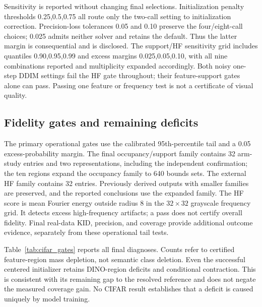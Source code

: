 Sensitivity is reported without changing final selections. Initialization
penalty thresholds 0.25,0.5,0.75 all route only the two-call setting to
initialization correction. Precision-loss tolerances 0.05 and 0.10 preserve the
four/eight-call choices; 0.025 admits neither solver and retains the default.
Thus the latter margin is consequential and is disclosed. The support/HF
sensitivity grid includes quantiles 0.90,0.95,0.99 and excess margins
0.025,0.05,0.10, with all nine combinations reported and multiplicity expanded
accordingly. Both noisy one-step DDIM settings fail the HF gate throughout;
their feature-support gates alone can pass. Passing one feature or frequency
test is not a certificate of visual quality.

\subsection{Fidelity gates and remaining deficits}
The primary operational gates use the calibrated 95th-percentile tail and a
0.05 excess-probability margin. The final occupancy/support family contains
32 arm-study entries and two representations, including the independent
confirmation; the ten regions expand the occupancy family to 640 bounds sets.
The external HF family contains 32 entries. Previously derived outputs with
smaller families are preserved, and the reported conclusions use the expanded
family. The HF score is mean Fourier energy outside radius 8 in the
$32\times32$ grayscale frequency grid. It detects excess high-frequency
artifacts; a pass does not certify overall fidelity. Final real-data KID,
precision, and coverage provide additional outcome evidence, separately from
these operational tail tests.

Table~\ref{tab:cifar_gates} reports all final diagnoses. Counts refer to certified
feature-region mass depletion, not semantic class deletion. Even the successful
centered initializer retains DINO-region deficits and conditional contraction.
This is consistent with its remaining gap to the resolved reference and does
not negate the measured coverage gain. No CIFAR result establishes that a
deficit is caused uniquely by model training.

